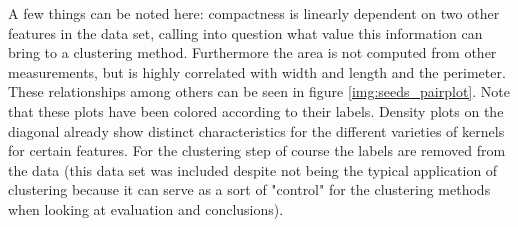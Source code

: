 A few things can be noted here: compactness is linearly dependent on two other features in the data set, calling into question what value this information can bring to a clustering method. Furthermore the area is not computed from other measurements, but is highly correlated with width and length and the perimeter. These relationships among others can be seen in figure \ref{img:seeds_pairplot}. Note that these plots have been colored according to their labels. Density plots on the diagonal already show distinct characteristics for the different varieties of kernels for certain features. For the clustering step of course the labels are removed from the data (this data set was included despite not being the typical application of clustering because it can serve as a sort of "control" for the clustering methods when looking at evaluation and conclusions).



